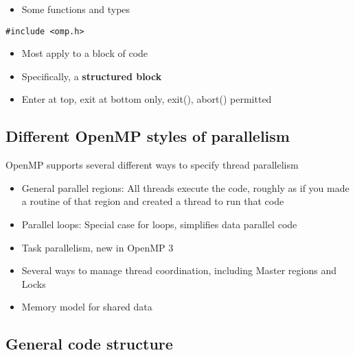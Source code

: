 \begin{itemize}
 \item Some functions and types 
\end{itemize}

\noindent


\begin{verbatim}
#include <omp.h>

\end{verbatim}

\begin{itemize}
 \item Most apply to a block of code

 \item Specifically, a \textbf{structured block}

 \item Enter at top, exit at bottom only, exit(), abort() permitted
\end{itemize}

\noindent
\subsection*{Different OpenMP styles of parallelism}
OpenMP supports several different ways to specify thread parallelism

\begin{itemize}
\item General parallel regions: All threads execute the code, roughly as if you made a routine of that region and created a thread to run that code

\item Parallel loops: Special case for loops, simplifies data parallel code

\item Task parallelism, new in OpenMP 3

\item Several ways to manage thread coordination, including Master regions and Locks

\item Memory model for shared data
\end{itemize}

\noindent
\subsection*{General code structure}

